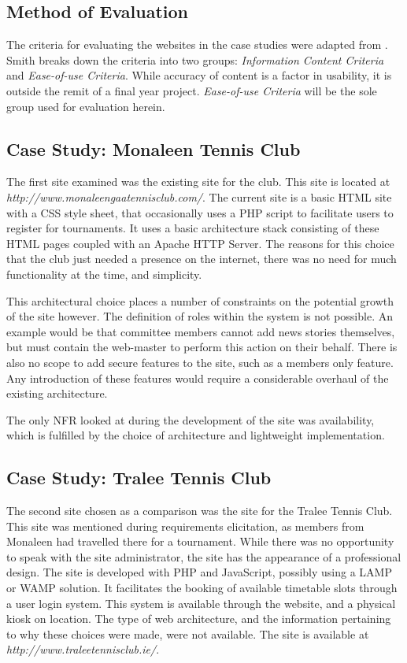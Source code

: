 \subsection{Method of Evaluation}

The criteria for evaluating the websites in the case studies were adapted from \cite{smith2001applying}. Smith breaks down the criteria into two groups: \textit{Information Content Criteria} and \textit{Ease-of-use Criteria}. While accuracy of content is a factor in usability, it is outside the remit of a final year project. \textit{Ease-of-use Criteria} will be the sole group used for evaluation herein. 


\subsection{Case Study: Monaleen Tennis Club}

The first site examined was the existing site for the club. This site is located at \newline\textit{http://www.monaleengaatennisclub.com/}. The current site is a basic HTML site with a CSS style sheet, that occasionally uses a PHP script to facilitate users to register for tournaments. It uses a basic architecture stack consisting of these HTML pages coupled with an Apache HTTP Server. The reasons for this choice that the club just needed a presence on the internet, there was no need for much functionality at the time, and simplicity.

This architectural choice places a number of constraints on the potential growth of the site however. The definition of roles within the system is not possible. An example would be that committee members cannot add news stories themselves, but must contain the web-master to perform this action on their behalf. There is also no scope to add secure features to the site, such as a members only feature. Any introduction of these features would require a considerable overhaul of the existing architecture.

The only NFR looked at during the development of the site was availability, which is fulfilled by the choice of architecture and lightweight implementation. 

\subsection{Case Study: Tralee Tennis Club}

The second site chosen as a comparison was the site for the Tralee Tennis Club. This site was mentioned during requirements elicitation, as members from Monaleen had travelled there for a tournament. While there was no opportunity to speak with the site administrator, the site has the appearance of a professional design. The site is developed with PHP and JavaScript, possibly using a LAMP or WAMP solution. It facilitates the booking of available timetable slots through a user login system. This system is available through the website, and a physical kiosk on location. The type of web architecture, and the information pertaining to why these choices were made, were not available. The site is available at \textit{http://www.traleetennisclub.ie/}.
\newpage

